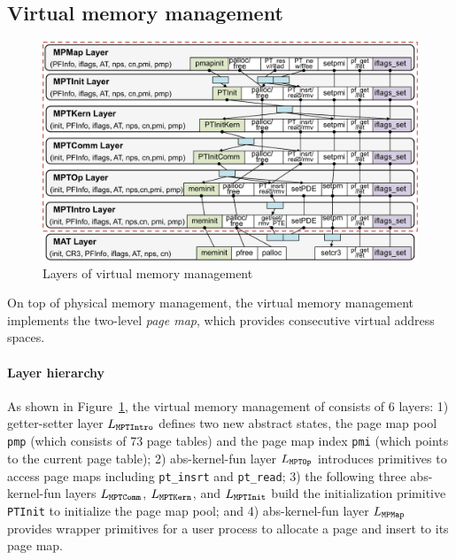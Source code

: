 \subsection{Virtual memory management}
\label{sec:base:vmm} 

\begin{figure}\centering
\includegraphics[scale=0.6]{figs/vmm_layer}	
\caption{Layers of virtual memory management}
\label{fig:base:vmm:layers}
\hrulefill
\end{figure}

On top of physical memory management,
the virtual memory management implements
the two-level \emph{page map}, which
provides consecutive virtual address spaces.

\paragraph{Layer hierarchy}
As shown in
Figure~\ref{fig:base:vmm:layers}, the virtual memory management of
\mCTOSbase{} consists of 6 layers: 1) getter-setter layer 
$L_{\texttt{MPTIntro}}$
defines two new abstract states, the page map pool \verb"pmp" (which
consists of 73 page tables) and the page map index \verb"pmi" (which
points to the current page table); 
2) abs-kernel-fun layer $L_{\texttt{MPTOp}}$
introduces primitives to access page maps including \verb"pt_insrt" and \verb"pt_read"; 3) the following three abs-kernel-fun layers
$L_{\texttt{MPTComm}}$, $L_{\texttt{MPTKern}}$, and $L_{\texttt{MPTInit}}$ build the
initialization primitive \verb"PTInit" to initialize the page map pool;
and 4) abs-kernel-fun layer $L_{\texttt{MPMap}}$ 
provides wrapper primitives
for a user process to allocate a page and insert to its page map.



